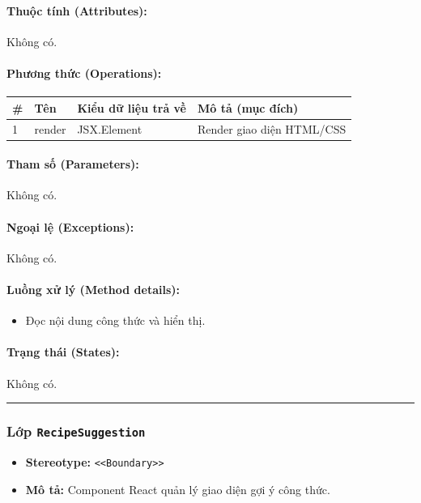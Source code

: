 \documentclass[12pt,a4paper]{article}
\begin{document}
\paragraph{Thuộc tính (Attributes):}
Không có.

\paragraph{Phương thức (Operations):}
\begin{longtable}{|p{0.6cm}|p{5.0cm}|p{2.8cm}|p{5.4cm}|}
\hline
\textbf{\#} & \textbf{Tên} & \textbf{Kiểu dữ liệu trả về} & \textbf{Mô tả (mục đích)} \\ \hline
\endhead
1 & render & JSX.Element & Render giao diện HTML/CSS \\ \hline
\end{longtable}

\paragraph{Tham số (Parameters):}
Không có.

\paragraph{Ngoại lệ (Exceptions):}
Không có.

\paragraph{Luồng xử lý (Method details):}
\begin{itemize}[leftmargin=*]
    \item Đọc nội dung công thức và hiển thị.
\end{itemize}


\paragraph{Trạng thái (States):}
Không có.

\vskip 0.5cm
\noindent\rule{\textwidth}{0.5pt}
\vskip 0.5cm

\subsubsection{Lớp \texttt{RecipeSuggestion}}

\begin{itemize}[leftmargin=*]
    \item \textbf{Stereotype:} \texttt{\textless{}\textless{}Boundary\textgreater{}\textgreater{}}
    \item \textbf{Mô tả:} Component React quản lý giao diện gợi ý công thức.
\end{itemize}
\end{document}
